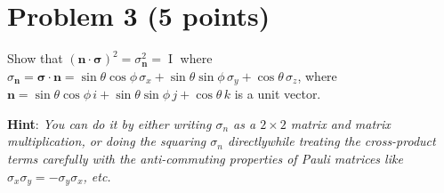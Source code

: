 \documentclass[11pt]{article}
\begin{document}
\section*{Problem 3 (5 points)}

Show that $(\boldsymbol{n} \cdot \boldsymbol{\sigma})^2 = \sigma_{\boldsymbol{n}}^2 = \operatorname{I}$ where $\sigma_{\boldsymbol{n}} = \boldsymbol{\sigma} \cdot \boldsymbol{n} = \sin\theta \cos\phi \, \sigma_x + \sin\theta \sin\phi \, \sigma_y + \cos\theta \, \sigma_z$, where $\boldsymbol{n} = \sin\theta \cos\phi \, i + \sin\theta \sin\phi \, j + \cos\theta \, k$ is a unit vector.

\textbf{Hint}: \textit{You can do it by either writing $\sigma_n$ as a $2 \times 2$ matrix and matrix multiplication, or doing the squaring $\sigma_n$ directlywhile treating the cross-product terms carefully with the
anti-commuting properties of Pauli matrices like $\sigma_x \sigma_y = - \sigma_y \sigma_x$, etc.}
\end{document}
